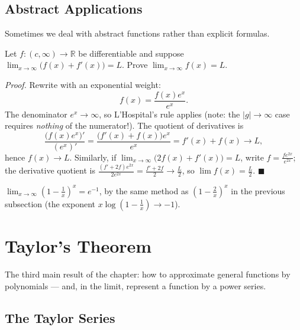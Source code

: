 \documentclass[11pt]{report}
\begin{document}
\subsection{Abstract Applications}

Sometimes we deal with abstract functions rather than explicit formulas.

\begin{exbox}
Let $f: (c, \infty) \to \mathbb{R}$ be differentiable and suppose $\lim_{x\to\infty} \bigl(f(x) + f'(x)\bigr) = L$. Prove $\lim_{x\to\infty} f(x) = L$.

\emph{Proof.} Rewrite with an exponential weight:
\[
f(x) = \frac{f(x)e^x}{e^x}.
\]
The denominator $e^x \to \infty$, so L'Hospital's rule applies (note: the $|g| \to \infty$ case requires \emph{nothing} of the numerator!). The quotient of derivatives is
\[
\frac{\bigl(f(x)e^x\bigr)'}{(e^x)'} = \frac{\bigl(f'(x) + f(x)\bigr)e^x}{e^x} = f'(x) + f(x) \longrightarrow L,
\]
hence $f(x) \to L$. Similarly, if $\lim_{x\to\infty}\bigl(2f(x) + f'(x)\bigr) = L$, write $f = \tfrac{f e^{2x}}{e^{2x}}$; the derivative quotient is $\tfrac{(f' + 2f)e^{2x}}{2e^{2x}} = \tfrac{f' + 2f}{2} \to \tfrac L2$, so $\lim f(x) = \tfrac L2$. \hfill $\blacksquare$
\end{exbox}

\begin{exbox}
$\displaystyle\lim_{x\to\infty}\left(1 - \frac1x\right)^x = e^{-1}$, by the same method as $\left(1-\tfrac2x\right)^x$ in the previous subsection (the exponent $x\log(1-\tfrac1x) \to -1$).
\end{exbox}


\section{Taylor's Theorem}

The third main result of the chapter: how to approximate general functions by polynomials --- and, in the limit, represent a function by a power series.

\subsection{The Taylor Series}
\end{document}
